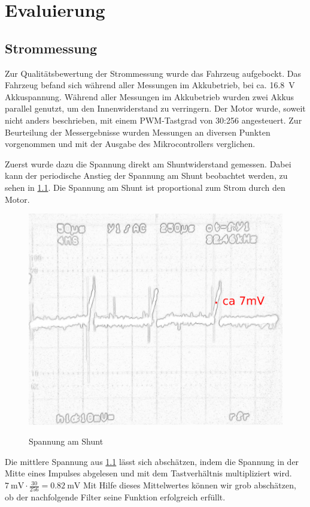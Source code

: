 \chapter{Evaluierung}



\section{Strommessung}

Zur Qualitätsbewertung der Strommessung wurde das Fahrzeug aufgebockt. 
Das Fahrzeug befand sich während aller Messungen im Akkubetrieb, bei ca. \SI{16,8}{\volt} Akkuspannung.
Während aller Messungen im Akkubetrieb wurden zwei Akkus parallel genutzt, um den Innenwiderstand zu verringern.
Der Motor wurde, soweit nicht anders beschrieben, mit einem PWM-Tastgrad von 30:256 angesteuert.
Zur Beurteilung der Messergebnisse wurden Messungen an diversen Punkten vorgenommen und mit der Ausgabe des Mikrocontrollers verglichen.

Zuerst wurde dazu die Spannung direkt am Shuntwiderstand gemessen.
Dabei kann der periodische Anstieg der Spannung am Shunt beobachtet werden, zu sehen in \cref{fig:filter_eingang}. Die Spannung am Shunt ist proportional zum Strom durch den Motor.

\begin{figure}[H]
\centering
\includegraphics[width=.8\textwidth]{filter_eingang_mak.png}\\
\caption{Spannung am Shunt}%
\label{fig:filter_eingang}
\end{figure}

Die mittlere Spannung aus \cref{fig:filter_eingang} lässt sich abschätzen, indem die Spannung in der Mitte eines Impulses abgelesen und mit dem Tastverhältnis multipliziert wird.
$\SI{7}{\mV}\cdot\frac{30}{256}=\SI{0,82}{\mV} $
Mit Hilfe dieses Mittelwertes können wir grob abschätzen, ob der nachfolgende Filter seine Funktion erfolgreich erfüllt.


